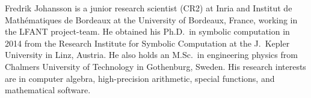 \documentclass[10pt,journal,compsoc,cspaper]{IEEEtran}
\begin{document}
\begin{IEEEbiographynophoto}{Fredrik Johansson}
is a junior research scientist (CR2)
at Inria and Institut de Math\'{e}matiques de Bordeaux
at the University of Bordeaux, France, working in the
LFANT project-team. He obtained his Ph.D.\ in symbolic computation in 2014
from the Research Institute for Symbolic Computation
at the J.\ Kepler University in Linz, Austria.
He also holds an M.Sc.\ in engineering physics from
Chalmers University of Technology in Gothenburg, Sweden.
His research interests are in computer algebra, high-precision arithmetic,
special functions, and mathematical software.
\end{IEEEbiographynophoto}

\newpage






\end{document}
